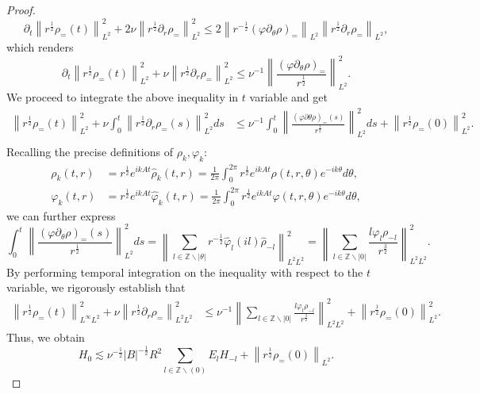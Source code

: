 \documentclass[final, 12pt,reqno]{amsart}
\numberwithin{equation}{section}
\begin{document}
\begin{proof}
$$
\partial_t\left\|r^{\frac{1}{2}}\rho_=(t)\right\|_{L^2}^2+2 \nu\left\|r^{\frac{1}{2}} \partial_r \rho_=\right\|_{L^2}^2 \leq 2\left\|r^{-\frac{1}{2}}(\varphi \partial_\theta \rho)_=\right\|_{L^2}\left\|r^{\frac{1}{2}} \partial_r \rho_=\right\|_{L^2},
$$
which renders
$$
\partial_t\left\|r^{\frac{1}{2}} \rho_=(t)\right\|_{L^2}^2+\nu\left\|r^{\frac{1}{2}} \partial_r \rho_=\right\|_{L^2}^2 \leq \nu^{-1}\left\|\frac{\left(\varphi \partial_\theta \rho\right)_=}{r^{\frac{1}{2}}}\right\|_{L^2}^2.
$$
We proceed to integrate the above inequality in $t$ variable and get
$$
\begin{aligned}
\left\|r^{\frac{1}{2}} \rho_=(t)\right\|_{L^2}^2+\nu\int_0^t\left\|r^{\frac{1}{2}} \partial_r \rho_=(s)\right\|_{L^2}^2 d s &\leq \nu^{-1} \int_0^t\left\|\frac{(\varphi \partial \theta \rho)_=(s)}{r^{\frac{1}{2}}}\right\|_{L^2}^2 d s+\left\|r^{\frac{1}{2}} \rho_=(0)\right\|_{L^2}^2.\\
\end{aligned}
$$
Recalling the precise definitions of $\rho_k, \varphi_k$:
$$
\begin{aligned}
\rho_k(t, r)& =r^{\frac{1}{2}} e^{i k A t} \hat{\rho}_k(t, r)=\frac{1}{2 \pi} \int_0^{2 \pi} r^{\frac{1}{2}} e^{i k A t} \rho(t, r, \theta) e^{-i k \theta} d \theta,\\
\varphi_k(t, r) & =r^{\frac{1}{2}} e^{i k A t} \hat{\varphi}_k(t, r)=\frac{1}{2 \pi} \int_0^{2 \pi} r^{\frac{1}{2}} e^{i k A t} \varphi(t, r, \theta) e^{-i k \theta} d \theta,
\end{aligned}
$$
we can further express
$$
\int_0^t\left\|\frac{\left(\varphi \partial_\theta \rho\right)_=(s)}{r^{\frac{1}{2}}}\right\|_{L^2}^2 d s=\left\|\sum_{l \in \mathbb{Z} \backslash|\theta|} r^{-\frac{1}{2}} \hat{\varphi}_l(i l) \hat{\rho}_{-l}\right\|_{L^2 L^2}^2=\left\|\sum_{l \in \mathbb{Z} \backslash|0|} \frac{l \varphi_l \rho_{-l}}{r^{\frac{3}{2}}}\right\|_{L^2 L^2}^2.
$$
By performing temporal integration on the inequality with respect to the $t$ variable, we rigorously establish that
$$
\begin{aligned}
\left\|r^{\frac{1}{2}} \rho_=(t)\right\|_{L^\infty L^2}^2+\nu \left\|r^{\frac{1}{2}} \partial_r \rho_=\right\|_{L^2L^2}^2  &\leq \nu^{-1}\left\|\sum_{l \in \mathbb{Z} \backslash|0|} \frac{l \varphi_l \rho_{-l}}{r^{\frac{3}{2}}}\right\|_{L^2 L^2}^2 +\left\|r^{\frac{1}{2}} \rho_=(0)\right\|_{L^2}^2.
\end{aligned}
$$
Thus, we obtain
    $$H_0\lesssim \nu^{-\frac{1}{2}}|B|^{-\frac{1}{2}}R^2\sum_{l \in \mathbb{Z} \backslash(0)}E_lH_{-l}+\left\|r^{\frac{1}{2}} \rho_=(0)\right\|_{L^2}.$$


\end{proof}
\end{document}
